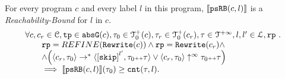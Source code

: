 \begin{theorem}
For every program ${c}$ and every label $l$ in this program,
$\llbracket \mathtt{psRB}(c, l) \rrbracket$ is a \emph{Reachability-Bound} for $l$ in $c$.
%
\[
    \begin{array}{l}
      \forall c, c_r \in \cdom, \tpath \in \absG(c), \trace_0 \in \ftdom_0(c),  \trace_r \in \ftdom_0(c_r), \trace \in \tdom, l, l' \in \ldom, \rprog \st 
      \\ \qquad
      \rprog = REFINE(\algrewrite(c))
      \land 
      \rprog = \algrewrite(c_r)
      \land
      \\ \qquad
      \land
      \Big(
      \config{c_r, \trace_0} \rightarrow^* \config{\clabel{\eskip}^{l'}, \trace_0 \tracecat \trace}
      \lor \config{c_r, \trace_0} \uparrow^{\infty} \trace_0 \tracecat \trace 
      \Big)
      \\ \qquad
      \implies \econfig{\psRB(c, l)}(\trace_0) \geq \counter(\trace, l).
    \end{array}
  \]
\end{theorem}
%
